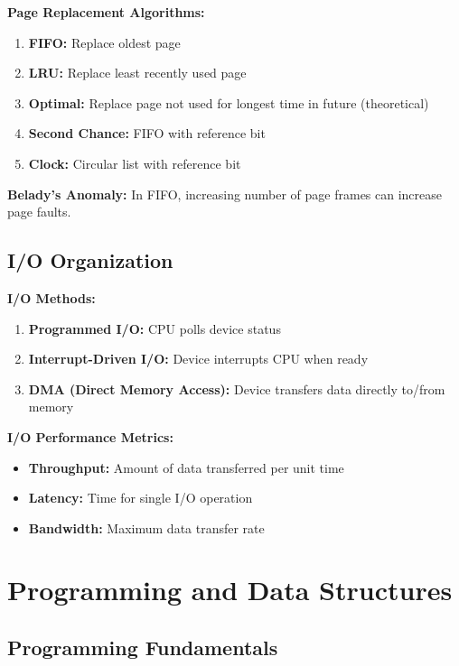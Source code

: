 \documentclass[11pt,a4paper]{article}
\begin{document}
\textbf{Page Replacement Algorithms:}
\begin{enumerate}
    \item \textbf{FIFO:} Replace oldest page
    \item \textbf{LRU:} Replace least recently used page
    \item \textbf{Optimal:} Replace page not used for longest time in future (theoretical)
    \item \textbf{Second Chance:} FIFO with reference bit
    \item \textbf{Clock:} Circular list with reference bit
\end{enumerate}

\begin{notebox}
\textbf{Belady's Anomaly:} In FIFO, increasing number of page frames can increase page faults.
\end{notebox}

\subsection{I/O Organization}

\textbf{I/O Methods:}
\begin{enumerate}
    \item \textbf{Programmed I/O:} CPU polls device status
    \item \textbf{Interrupt-Driven I/O:} Device interrupts CPU when ready
    \item \textbf{DMA (Direct Memory Access):} Device transfers data directly to/from memory
\end{enumerate}

\textbf{I/O Performance Metrics:}
\begin{itemize}
    \item \textbf{Throughput:} Amount of data transferred per unit time
    \item \textbf{Latency:} Time for single I/O operation
    \item \textbf{Bandwidth:} Maximum data transfer rate
\end{itemize}

\section{Programming and Data Structures}

\subsection{Programming Fundamentals}
\end{document}
